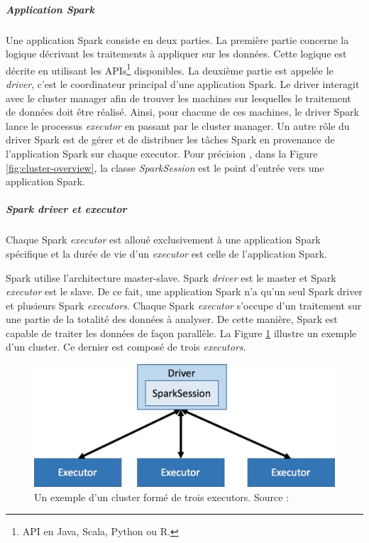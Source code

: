 \subparagraph{Application Spark}
Une application Spark consiste en deux parties. La première partie concerne la logique décrivant les traitements à appliquer sur les données.  Cette logique est décrite en utilisant les APIs\footnote{API en Java, Scala, Python ou R.} disponibles. La deuxième partie est appelée le \textit{driver}, c'est le coordinateur principal d'une application Spark. Le driver interagit avec le cluster manager afin de trouver les machines sur lesquelles le traitement de données doit être réalisé. Ainsi, pour chacune de ces machines, le driver Spark lance le processus \textit{executor} en passant par le cluster manager. Un autre rôle du  driver Spark est de gérer et de distribuer les tâches Spark en provenance de l'application Spark sur chaque executor. Pour précision , dans la Figure \ref{fig:cluster-overview}, la classe \textit{SparkSession} est le point d'entrée vers une application Spark.

\subparagraph{Spark driver et executor}

Chaque Spark \textit{executor} est alloué exclusivement à une application Spark spécifique et la durée de vie d'un \textit{executor} est celle de l'application Spark. 

Spark utilise l'architecture master-slave. Spark \textit{driver} est le master et Spark \textit{executor} est le slave. De ce fait, une application Spark n'a qu'un seul Spark driver et plusieurs Spark \textit{executors}. Chaque Spark \textit{executor} s'occupe d'un traitement  sur une partie de la totalité des données à analyser. De cette manière,  Spark est capable de traiter  les données de façon parallèle. La Figure \ref{fig:small-cluster-3} illustre un exemple d'un cluster. Ce dernier est composé de trois \textit{executors}.
\begin{figure}[H]
	\centering
	\includegraphics[width=0.7\linewidth]{illustrations/small-cluster-3}
	\caption{Un exemple d'un cluster formé de trois executors. Source : \cite{eginning-Apache-Spark-2-cluster-example}}
	\label{fig:small-cluster-3}
\end{figure}


